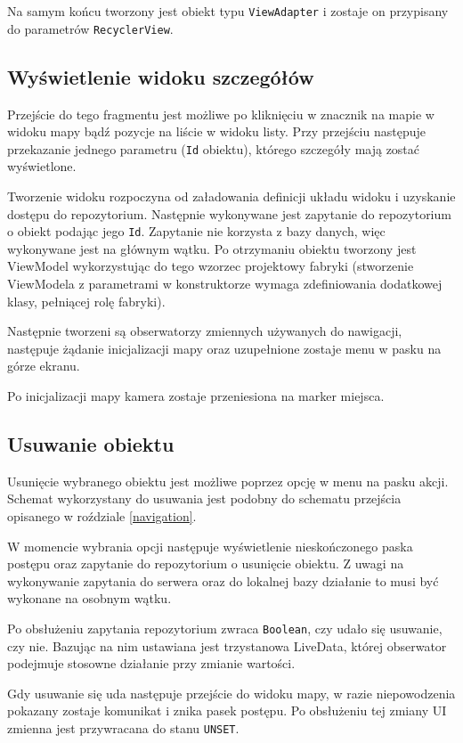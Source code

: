 \documentclass[polish,polish,a4paper,12pt]{article}
\begin{document}
	Na samym końcu tworzony jest obiekt typu \texttt{ViewAdapter} i zostaje on przypisany do parametrów \texttt{RecyclerView}.

	\subsection{Wyświetlenie widoku szczegółów}

	Przejście do tego fragmentu jest możliwe po kliknięciu w znacznik na mapie w widoku mapy bądź pozycje na liście w widoku listy. Przy przejściu następuje przekazanie jednego parametru (\texttt{Id} obiektu), którego szczegóły mają zostać wyświetlone.

	Tworzenie widoku rozpoczyna od załadowania definicji układu widoku i uzyskanie dostępu do repozytorium. Następnie wykonywane jest zapytanie do repozytorium o obiekt podając jego \texttt{Id}. Zapytanie nie korzysta z bazy danych, więc wykonywane jest na głównym wątku. Po otrzymaniu obiektu tworzony jest ViewModel wykorzystując do tego wzorzec projektowy fabryki (stworzenie ViewModela z parametrami w konstruktorze wymaga zdefiniowania dodatkowej klasy, pełniącej rolę fabryki).

	Następnie tworzeni są obserwatorzy zmiennych używanych do nawigacji, następuje żądanie inicjalizacji mapy oraz uzupełnione zostaje menu w pasku na górze ekranu.

	Po inicjalizacji mapy kamera zostaje przeniesiona na marker miejsca.

	\subsection{Usuwanie obiektu}

	Usunięcie wybranego obiektu jest możliwe poprzez opcję w menu na pasku akcji. Schemat wykorzystany do usuwania jest podobny do schematu przejścia opisanego w roździale \ref{navigation}.

	W momencie wybrania opcji następuje wyświetlenie nieskończonego paska postępu oraz zapytanie do repozytorium o usunięcie obiektu. Z uwagi na wykonywanie zapytania do serwera oraz do lokalnej bazy działanie to musi być wykonane na osobnym wątku.

	Po obsłużeniu zapytania repozytorium zwraca \texttt{Boolean}, czy udało się usuwanie, czy nie. Bazując na nim ustawiana jest trzystanowa LiveData, której obserwator podejmuje stosowne działanie przy zmianie wartości.

	Gdy usuwanie się uda następuje przejście do widoku mapy, w razie niepowodzenia pokazany zostaje komunikat i znika pasek postępu. Po obsłużeniu tej zmiany UI zmienna jest przywracana do stanu \texttt{UNSET}.
\end{document}
